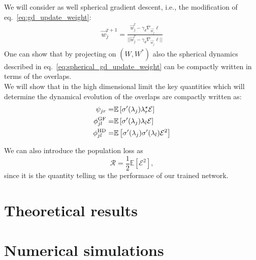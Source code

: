 \documentclass{article}
\theoremstyle{plain}
\theoremstyle{definition}
\theoremstyle{remark}
\begin{document}
We will consider as well spherical gradient descent, i.e., the modification of eq.~\eqref{eq:gd_update_weight}: 
\begin{align}
    \vec w_j^{\tau + 1} = \frac{
    \vec w_j^\tau - \gamma_d  \nabla_{\vec w_j} \ell}
    {|| \vec w_j^\tau - \gamma_d  \nabla_{\vec w_j}\ell||}
    \label{eq:spherical_gd_update_weight}
\end{align}
One can show that by projecting on $(W,W^*)$  also the spherical dynamics described in eq.~\eqref{eq:spherical_gd_update_weight} can be compactly written in terms of the overlaps. 
\\ We will show that in the high dimensional limit the key quantities which will determine the dynamical evolution of the overlaps are compactly written as:
\begin{equation}
\begin{aligned}
    \psi_{jr} =&\mathbb{E}\left[ \sigma'(\lambda_j)\lambda^{\star}_{r} \mathcal{E} \right] \\
    \phi^{\rm{GF}}_{jl}=&\mathbb{E}\left[ \sigma'(\lambda_j)\lambda_{l} \mathcal{E} \right] \\
    \phi^{\rm{HD}}_{jl}=&\mathbb{E}\left[ \sigma'(\lambda_j)\sigma'(\lambda_l)\mathcal{E}^2  \right]
    \label{eq:simplify} 
\end{aligned}
\end{equation}

We can also introduce the population loss as
\begin{equation}
    \mathcal R = \frac12 \mathbb{E}\left[\mathcal E^2\right],
\end{equation}
since it is the quantity telling us the performace of our trained network.



\section{Theoretical results}

\section{Numerical simulations}
\end{document}
